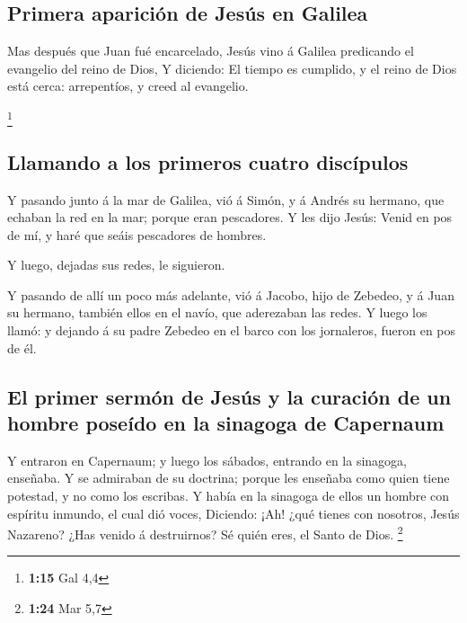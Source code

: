\hypertarget{primera-apariciuxf3n-de-jesuxfas-en-galilea}{%
\subsection{Primera aparición de Jesús en
Galilea}\label{primera-apariciuxf3n-de-jesuxfas-en-galilea}}

 Mas después que Juan fué encarcelado, Jesús vino á
Galilea predicando el evangelio del reino de Dios,  Y
diciendo: El tiempo es cumplido, y el reino de Dios está cerca:
arrepentíos, y creed al evangelio.

\footnote{\textbf{1:15} Gal 4,4}

\hypertarget{llamando-a-los-primeros-cuatro-discuxedpulos}{%
\subsection{Llamando a los primeros cuatro
discípulos}\label{llamando-a-los-primeros-cuatro-discuxedpulos}}

 Y pasando junto á la mar de Galilea, vió á Simón, y á
Andrés su hermano, que echaban la red en la mar; porque eran pescadores.
 Y les dijo Jesús: Venid en pos de mí, y haré que seáis
pescadores de hombres.

 Y luego, dejadas sus redes, le siguieron.

 Y pasando de allí un poco más adelante, vió á Jacobo,
hijo de Zebedeo, y á Juan su hermano, también ellos en el navío, que
aderezaban las redes.  Y luego los llamó: y dejando á su
padre Zebedeo en el barco con los jornaleros, fueron en pos de él.

\hypertarget{el-primer-sermuxf3n-de-jesuxfas-y-la-curaciuxf3n-de-un-hombre-poseuxeddo-en-la-sinagoga-de-capernaum}{%
\subsection{El primer sermón de Jesús y la curación de un hombre poseído
en la sinagoga de
Capernaum}\label{el-primer-sermuxf3n-de-jesuxfas-y-la-curaciuxf3n-de-un-hombre-poseuxeddo-en-la-sinagoga-de-capernaum}}

 Y entraron en Capernaum; y luego los sábados, entrando
en la sinagoga, enseñaba.  Y se admiraban de su doctrina;
porque les enseñaba como quien tiene potestad, y no como los escribas.
 Y había en la sinagoga de ellos un hombre con espíritu
inmundo, el cual dió voces,  Diciendo: ¡Ah! ¿qué tienes
con nosotros, Jesús Nazareno? ¿Has venido á destruirnos? Sé quién eres,
el Santo de Dios. \footnote{\textbf{1:24} Mar 5,7}

